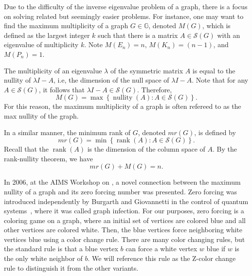 \documentclass{article}
\theoremstyle{definition}
\newcommand\nullity[1]{\operatorname{nullity}\left(#1\right)}
\newcommand\rank[1]{\operatorname{rank}\left(#1\right)}
\begin{document}
Due to the difficulty of the inverse eigenvalue problem of a graph, there is a focus on solving related but seemingly easier problems.
For instance, one may want to find the maximum multiplicity of a graph $G\in\mathbb{G}$, denoted $M(G)$, which is defined as the largest integer $k$ such that there is a matrix $A\in\mathcal{S}(G)$ with an eigenvalue of multiplicity $k$.
Note $M(E_{n})=n$, $M(K_{n})=(n-1)$,  and $M(P_{n})=1$.

The multiplicity of an eigenvalue $\lambda$ of the symmetric matrix $A$ is equal to the nullity of $\lambda I - A$, i.e,  the dimension of the null space of $\lambda I-A$.
Note that for any $A\in\mathcal{S}(G)$, it follows that $\lambda I - A\in\mathcal{S}(G)$.
Therefore,
\[
M(G) = \max\left\{\nullity{A}\colon A\in\mathcal{S}(G)\right\}.
\]
For this reason, the maximum multiplicity of a graph is often refereed to as the max nullity of the graph. 

In a similar manner, the minimum rank of $G$, denoted $mr(G)$, is defined by 
\[
mr(G) = \min\left\{\rank{A}\colon A\in\mathcal{S}(G)\right\}.
\]
Recall that the $\rank{A}$ is the dimension of the column space of $A$.
By the rank-nullity theorem, we have
\[
mr(G) + M(G) = n.
\]

In 2006, at the AIMS Workshop on , a novel connection between the maximum nullity of a graph and its zero forcing number was presented. 
Zero forcing was introduced independently by Burgarth and Giovannetti in the control of quantum systems~\cite{Burgarth2007}, where it was called graph infection.
For our purposes, zero forcing is a coloring game on a graph, where an initial set of vertices are colored blue and all other vertices are colored white.
Then, the blue vertices force neighboring white vertices blue using a color change rule.
There are many color changing rules, but the standard rule is that a blue vertex $b$ can force a white vertex $w$ blue if $w$ is the only white neighbor of $b$.
We will reference this rule as the Z-color change rule to distinguish it from the other variants. 

\end{document}

